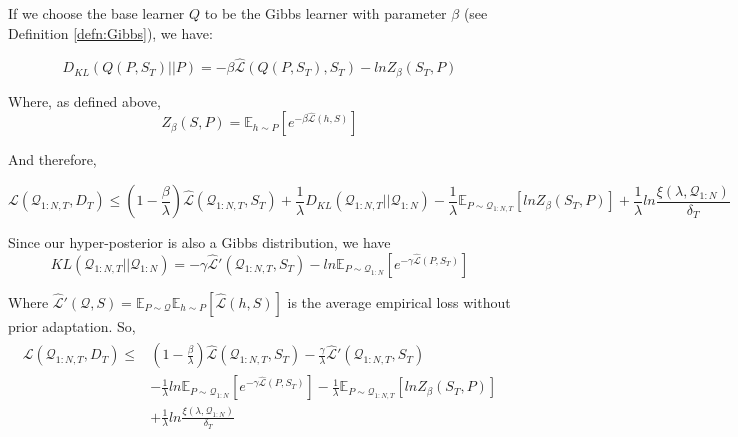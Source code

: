 \documentclass{article}
\theoremstyle{definition}
\newcommand{\Expect}[2]{\mathbb{E}_{#1}\left [#2 \right ]}
\begin{document}
If we choose the base learner $Q$ to be the Gibbs learner with parameter $\beta$ (see Definition \ref{defn:Gibbs}), we have:

$$D_{KL}(Q(P,S_T)||P)=-\beta\hat{\mathcal{L}}(Q(P,S_T), S_T)-lnZ_\beta(S_T,P)$$

Where, as defined above, $$Z_\beta(S,P)=\Expect{h\sim P}{e^{-\beta\hat{\mathcal{L}}(h,S)}}$$

And therefore,

$$\mathcal{L}(\mathcal{Q}_{1:N,T}, D_T) \leq (1-\frac{\beta}{\lambda})\hat{\mathcal{L}}(\mathcal{Q}_{1:N,T}, S_T) + \frac{1}{\lambda}D_{KL}(\mathcal{Q}_{1:N,T}||\mathcal{Q}_{1:N})-\frac{1}{\lambda}\Expect{P\sim \mathcal{Q}_{1:N,T}}{lnZ_{\beta}(S_T,P)}+\frac{1}{\lambda}ln\frac{\xi(\lambda,\mathcal{Q}_{1:N})}{\delta_T}$$

Since our hyper-posterior is also a Gibbs distribution, we have 
$$KL(\mathcal{Q}_{1:N,T}||\mathcal{Q}_{1:N})=
-\gamma\hat{\mathcal{L}}'(\mathcal{Q}_{1:N,T}, S_T)-ln\Expect{P\sim \mathcal{Q}_{1:N}}{e^{-\gamma\hat{\mathcal{L}}(P,S_T)}}$$ 

Where $\hat{\mathcal{L}}'(\mathcal{Q},S)=\mathbb{E}_{P\sim \mathcal{Q}}\mathbb{E}_{h\sim P}\left [\hat{\mathcal{L}}(h, S)\right ]$ is the average empirical loss without prior adaptation.
So,
\begin{align*} 
\begin{split}
\mathcal{L}(\mathcal{Q}_{1:N,T}, D_T) \leq &(1-\frac{\beta}{\lambda})\hat{\mathcal{L}}(\mathcal{Q}_{1:N,T}, S_T) -\frac{\gamma}{\lambda}\hat{\mathcal{L}}'(\mathcal{Q}_{1:N,T}, S_T) \\ &- \frac{1}{\lambda}ln\Expect{P\sim \mathcal{Q}_{1:N}}{e^{-\gamma\hat{\mathcal{L}}(P,S_T)}}-\frac{1}{\lambda}\Expect{P\sim \mathcal{Q}_{1:N,T}}{lnZ_{\beta}(S_T,P)}\\ &+\frac{1}{\lambda}ln\frac{\xi(\lambda,\mathcal{Q}_{1:N})}{\delta_T}
\end{split}
\end{align*}
\end{document}
